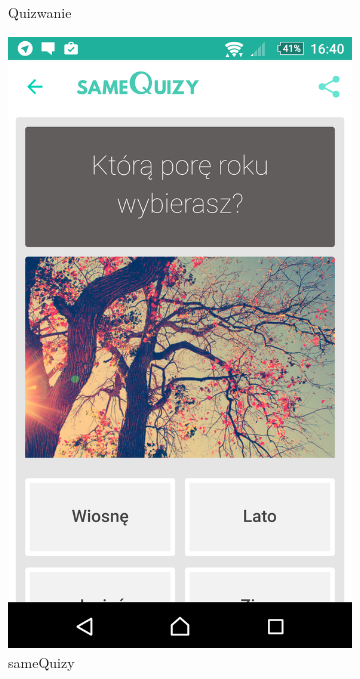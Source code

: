 \documentclass[archivemod, eng]{mgr}
\begin{document}
\begin{figure}[ht]
\begin{subfigure}{.32\textwidth}
				\caption{Quizwanie}
				\label{fig:quizowanie}
			\end{subfigure}
			\begin{subfigure}{.32\textwidth}
				\centering
				\includegraphics[width=.9\linewidth]{sameQuizy.png}
				\caption{sameQuizy}
				\label{fig:same_quizy}
			\end{subfigure}
			\begin{subfigure}{.32\textwidth}
				\centering

\end{subfigure}
\end{figure}
\end{document}
